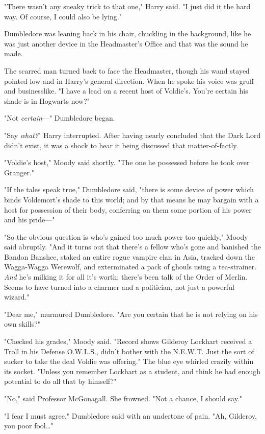 "There wasn't any sneaky trick to that one," Harry said. "I just did it the 
hard way. Of course, I could also be lying."

Dumbledore was leaning back in his chair, chuckling in the background, like he 
was just another device in the Headmaster's Office and that was the sound he 
made.

The scarred man turned back to face the Headmaster, though his wand stayed 
pointed low and in Harry's general direction. When he spoke his voice was gruff 
and businesslike. "I have a lead on a recent host of Voldie's. You're certain 
his shade is in Hogwarts now?"

"Not \emph{certain}---" Dumbledore began.

"Say \emph{what?}" Harry interrupted. After having nearly concluded that the 
Dark Lord didn't exist, it was a shock to hear it being discussed that 
matter-of-factly.

"Voldie's host," Moody said shortly. "The one he possessed before he took over 
Granger."

"If the tales speak true," Dumbledore said, "there is some device of power 
which binds Voldemort's shade to this world; and by that means he may bargain 
with a host for possession of their body, conferring on them some portion of 
his power and his pride---"

"So the obvious question is who's gained too much power too quickly," Moody 
said abruptly. "And it turns out that there's a fellow who's gone and banished 
the Bandon Banshee, staked an entire rogue vampire clan in Asia, tracked down 
the Wagga-Wagga Werewolf, and exterminated a pack of ghouls using a 
tea-strainer. \emph{And} he's milking it for all it's worth; there's been talk 
of the Order of Merlin. Seems to have turned into a charmer and a politician, 
not just a powerful wizard."

"Dear me," murmured Dumbledore. "Are you certain that he is not relying on his 
own skills?"

"Checked his grades," Moody said. "Record shows Gilderoy Lockhart received a 
Troll in his Defense O.W.L.S., didn't bother with the N.E.W.T. Just the sort of 
sucker to take the deal Voldie was offering." The blue eye whirled crazily 
within its socket. "Unless you remember Lockhart as a student, and think he had 
enough potential to do all that by himself?"

"No," said Professor McGonagall. She frowned. "Not a chance, I should say."

"I fear I must agree," Dumbledore said with an undertone of pain. "Ah, 
Gilderoy, you poor fool{\ldots}"

